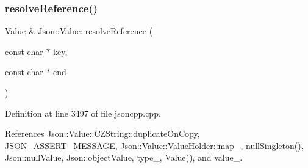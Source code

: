 \subsubsection{\texorpdfstring{resolve\+Reference()}{resolveReference()}\hspace{0.1cm}{\footnotesize\ttfamily [2/2]}}
{\footnotesize\ttfamily \hyperlink{class_json_1_1_value}{Value} \& Json\+::\+Value\+::resolve\+Reference (\begin{DoxyParamCaption}\item[{const char $\ast$}]{key,  }\item[{const char $\ast$}]{end }\end{DoxyParamCaption})\hspace{0.3cm}{\ttfamily [private]}}



Definition at line 3497 of file jsoncpp.\+cpp.



References Json\+::\+Value\+::\+C\+Z\+String\+::duplicate\+On\+Copy, J\+S\+O\+N\+\_\+\+A\+S\+S\+E\+R\+T\+\_\+\+M\+E\+S\+S\+A\+GE, Json\+::\+Value\+::\+Value\+Holder\+::map\+\_\+, null\+Singleton(), Json\+::null\+Value, Json\+::object\+Value, type\+\_\+, Value(), and value\+\_\+.


